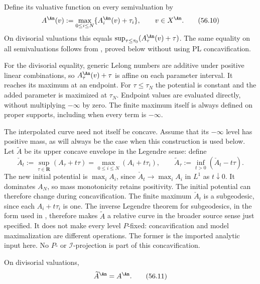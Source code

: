 \begin{definition}
\label{def:va-pl-analytification}
Define its valuative function on every semivaluation by
\[
 A^{\An}(v):=\max_{0\leq i\leq N}\{A_i^{\An}(v)+\tau_i\},
                         \qquad v\in X^{\An}.
\tag{56.10}\label{eq:va-pl-max}
\]
On divisorial valuations this equals
$\sup_{\tau\leq\tau_0}(A_\tau^{\An}(v)+\tau)$.
The same equality on all semivaluations follows from
, proved below without using
PL concavification.
\end{definition}

For the divisorial equality, generic Lelong numbers are additive under
positive linear combinations, so $A_\tau^{\An}(v)+\tau$ is affine
on each parameter interval. It reaches its maximum at an endpoint.
For $\tau\leq\tau_N$ the potential is constant and the added parameter
is maximized at $\tau_N$. Endpoint values are evaluated directly,
without multiplying $-\infty$ by zero. The finite maximum itself is
always defined on proper supports, including when every term is
$-\infty$.

The interpolated curve need not itself be concave.  Assume that its
$-\infty$ level has positive mass, as will always be the case when this
construction is used below.  Let $\widetilde A$ be its upper concave
envelope in the Legendre sense: define
\[
 \check A_t:=\sup_{\tau\in\mathbf R}(A_\tau+t\tau)
            =\max_{0\leq i\leq N}(A_i+t\tau_i),
 \qquad
 \widetilde A_\tau:=\inf_{t>0}(\check A_t-t\tau).
\]
The new initial potential is $\max_i A_i$, since
$\check A_t\to\max_i A_i$ in $L^1$ as $t\downarrow0$.
It dominates $A_N$, so mass monotonicity retains positivity. The
initial potential can therefore change during concavification.
The finite maximum $\check A_t$ is a subgeodesic, since each
$A_i+t\tau_i$ is one.  The inverse Legendre theorem
for subgeodesics, in the form used in
\cite[Lemma~3.2]{DXZ23}, therefore makes $\widetilde A$ a relative curve in the broader
source sense just specified. It does not make every level $P$-fixed:
concavification and model maximalization are different operations.
The former is the imported analytic input here. No $P$- or
$\mathcal I$-projection is part of this concavification.

\begin{proposition}\label{prop:va-pl-replacement}
On divisorial valuations,
\[
                         \widetilde A^{\An}=A^{\An}.
\tag{56.11}\label{eq:va-pl-replacement}
\]
\end{proposition}

